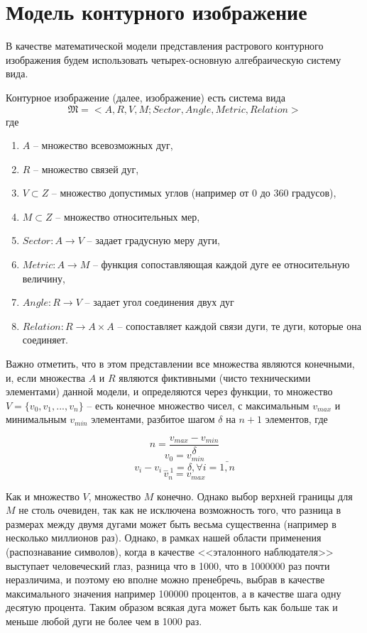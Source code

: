 \section{Модель контурного изображение}
В качестве математической модели представления растрового контурного изображения будем использовать четырех-основную алгебраическую систему вида.
\begin{definition}
Контурное изображение (далее, изображение) есть система вида
\begin{equation}
\mathfrak{M} = < A, R, V, M; Sector, Angle, Metric, Relation >
\label{eq:model}
\end{equation}
где
\begin{enumerate}
\item[] $A$ -- множество всевозможных дуг,
\item[] $R$ -- множество связей дуг,
\item[] $V \subset Z$ -- множество допустимых углов (например от 0 до 360 градусов),
\item[] $M \subset Z$ -- множество относительных мер,
\item[] $Sector: A \rightarrow V$ -- задает градусную меру дуги,
\item[] $Metric: A \rightarrow M$ -- функция сопоставляющая каждой дуге ее относительную величину,
\item[] $Angle: R \rightarrow V$ -- задает угол соединения двух дуг
\item[] $Relation: R \rightarrow A \times A$ -- сопоставляет каждой связи дуги, те дуги, которые она соединяет.
\end{enumerate}
\end{definition}

\begin{remark}
Важно отметить, что в этом представлении все множества являются конечными, и, если множества $A$ и $R$ являются фиктивными (чисто техническими элементами) данной модели, и определяются через функции, то множество $V = \{v_0, v_1, ..., v_n\}$ -- есть конечное множество чисел, с максимальным $v_{max}$ и минимальным $v_{min}$ элементами, разбитое шагом $\delta$ на $n+1$ элементов, где 

$$n = \frac{v_{max} - v_{min}}{\delta} $$
$$v_0 = v_{min}$$
$$v_{i} - v_{i-1} = \delta, \forall i=\bar{1,n} $$
$$v_n = v_{max} $$
\end{remark}

\begin{remark}
Как и множество $V$, множество $M$ конечно. Однако выбор верхней границы для $M$ не столь очевиден, так как не исключена возможность того, что разница в размерах между двумя дугами может быть весьма существенна (например в несколько миллионов раз). Однако, в рамках нашей области применения (распознавание символов), когда в качестве <<эталонного наблюдателя>> выступает человеческий глаз, разница что в 1000, что в 1000000 раз почти неразличима, и поэтому ею вполне можно пренебречь, выбрав в качестве максимального значения например 100000 процентов, а в качестве шага одну десятую процента. Таким образом всякая дуга может быть как больше так и меньше любой дуги не более чем в 1000 раз.
\end{remark}

